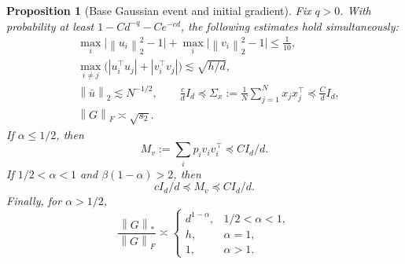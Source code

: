 \documentclass[11pt]{article}
\newtheorem{proposition}[proposition]{Proposition}
\theoremstyle{definition}
\newcommand{\Id}{I}
\newcommand{\norm}[1]{\left\lVert #1\right\rVert_2}
\newcommand{\normF}[1]{\left\lVert #1\right\rVert_F}
\newcommand{\normnuc}[1]{\left\lVert #1\right\rVert_*}
\begin{document}
\begin{proposition}[Base Gaussian event and initial gradient]
\label{prop:base-event}
Fix $q>0$.  With probability at least
$1-Cd^{-q}-Ce^{-cd}$, the following estimates hold simultaneously:
\begin{align}
 &\max_i\bigl|\norm{u_i}^2-1\bigr|
 +\max_i\bigl|\norm{v_i}^2-1\bigr|\leq\frac1{10},
 \label{eq:base-norms}\\
 &\max_{i\neq j}
 \bigl(|u_i^\top u_j|+|v_i^\top v_j|\bigr)
 \lesssim\sqrt{h/d},
 \label{eq:base-inner}\\
 &\norm{\bar u}\lesssim N^{-1/2},
 \qquad
 \frac c d\Id_d\preceq
 \Sigma_x:=\frac1N\sum_{j=1}^N x_jx_j^\top
 \preceq\frac C d\Id_d,
 \label{eq:base-Sigma}\\
 &\normF{G}\asymp\sqrt{s_2}.
 \label{eq:base-GF}
\end{align}
If $\alpha\leq1/2$, then
\begin{equation}
 M_v:=\sum_i p_i v_iv_i^\top\preceq C\Id_d/d.
 \label{eq:base-Mv-upper}
\end{equation}
If $1/2<\alpha<1$ and $\beta(1-\alpha)>2$, then
\begin{equation}
 c\Id_d/d\preceq M_v\preceq C\Id_d/d.
 \label{eq:base-Mv-two-sided}
\end{equation}
Finally, for $\alpha>1/2$,
\begin{equation}
 \frac{\normnuc{G}}{\normF{G}}
 \asymp
 \begin{cases}
 d^{1-\alpha},&1/2<\alpha<1,\\
 h,&\alpha=1,\\
 1,&\alpha>1.
 \end{cases}
 \label{eq:base-nuclear}
\end{equation}
\end{proposition}
\end{document}
